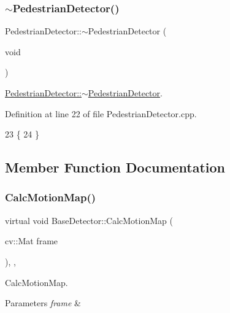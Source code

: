\subsubsection{\texorpdfstring{$\sim$\+Pedestrian\+Detector()}{~PedestrianDetector()}}
{\footnotesize\ttfamily Pedestrian\+Detector\+::$\sim$\+Pedestrian\+Detector (\begin{DoxyParamCaption}\item[{void}]{ }\end{DoxyParamCaption})}



\mbox{\hyperlink{class_pedestrian_detector_af093451952c64eb107ac2e2aff115b6c}{Pedestrian\+Detector\+::$\sim$\+Pedestrian\+Detector}}. 



Definition at line 22 of file Pedestrian\+Detector.\+cpp.


\begin{DoxyCode}
23 \{
24 \}
\end{DoxyCode}


\subsection{Member Function Documentation}
\mbox{\label{class_base_detector_a73c66f0d4dad263fcf65c09a6f6feda2}} 
\subsubsection{\texorpdfstring{Calc\+Motion\+Map()}{CalcMotionMap()}}
{\footnotesize\ttfamily virtual void Base\+Detector\+::\+Calc\+Motion\+Map (\begin{DoxyParamCaption}\item[{cv\+::\+Mat}]{frame }\end{DoxyParamCaption})\hspace{0.3cm}{\ttfamily [inline]}, {\ttfamily [virtual]}, {\ttfamily [inherited]}}



Calc\+Motion\+Map. 


\begin{DoxyParams}{Parameters}
{\em frame} & \\
\hline
\end{DoxyParams}


